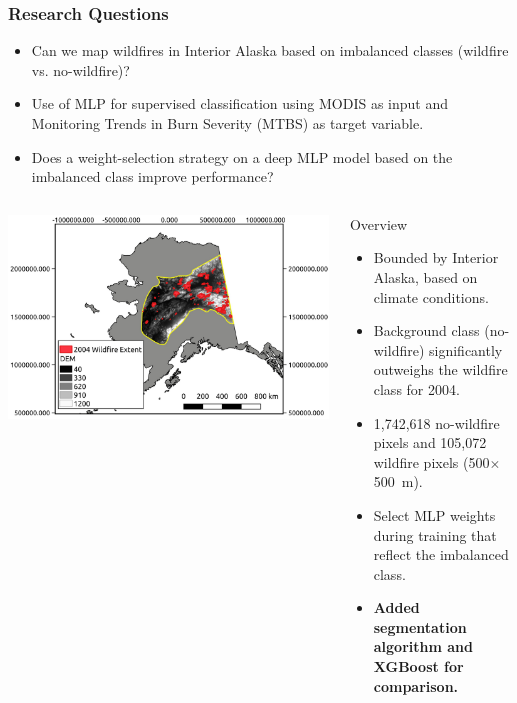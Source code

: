\documentclass{beamer}
\begin{document}
\begin{frame}
  \frametitle{Research Questions}
  \begin{itemize}
  \footnotesize
   \item Can we map wildfires in Interior Alaska based on imbalanced classes 
(wildfire vs. no-wildfire)?
\item Use of MLP for supervised classification using MODIS as input and 
Monitoring Trends in Burn Severity (MTBS) as target variable.
   \item Does a weight-selection strategy on a deep MLP model based on the imbalanced class improve performance? 
  \end{itemize}

\begin{columns}[T]
\begin{column}{.60\textwidth}
  \centering
             \includegraphics[width=\textwidth]{figs/study_area}
\end{column}%
\hfill%
\begin{column}{.40\textwidth}
Overview
\scriptsize
\begin{itemize}
 \item Bounded by Interior Alaska, based on climate conditions. 
 \item Background class (no-wildfire) significantly outweighs the wildfire class for 2004.
 \item 1,742,618 no-wildfire pixels and 105,072 wildfire pixels (500$\times$500~m).
 \item Select MLP weights during training that reflect the imbalanced class. 
 \item \textbf{Added segmentation algorithm and XGBoost for comparison.}
\end{itemize}
  
\end{column}%
\end{columns}
  
\end{frame}
\end{document}
